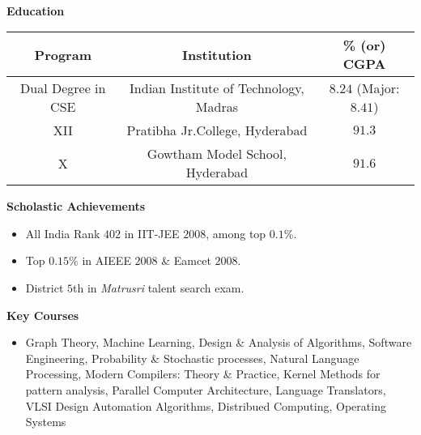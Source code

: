 \documentclass[letterpaper,11pt]{article}
\makeatletter
\newcommand{\resitem}[1]{\item #1 \vspace{-2pt}}
\newcommand{\resheading}[1]{{\large \colorbox{mygrey}{\begin{minipage}{\textwidth}{\textbf{#1 \vphantom{p\^{E}}}}\end{minipage}}}}
\newcommand{\ressubheading}[4]{
\begin{tabular*}{6.5in}{l@{\extracolsep{\fill}}r}
		\textbf{#1} & #2 \\
		\textit{#3} & \textit{#4} \\
\end{tabular*}\vspace{-6pt}}
\makeatother
\begin{document}
\vspace{0.1in}
\hrulefill \\
\vspace{0.05in}
\resheading{Education}
	\begin{center}
	\begin{tabular}{| c | c | c |}
	\hline
	\textbf{Program} & \textbf{Institution} & \textbf{\% (or) CGPA} \\ \hline
	\hspace{0.1in} Dual Degree in CSE \hspace{0.1in} & \hspace{0.1in} Indian Institute of Technology, Madras \hspace{0.1in} & \hspace{0.1in} $8.24$ (Major: $8.41$) \hspace{0.1in} \\ \hline
	XII & Pratibha Jr.College, Hyderabad & $91.3$ \\ \hline
	X & Gowtham Model School, Hyderabad & $91.6$ \\ \hline
	\end{tabular}	
	\end{center}
\resheading{Scholastic Achievements}
	\begin{itemize}
		\resitem{\footnotesize All India Rank $402$ in IIT-JEE $2008$, among top $0.1$\%.}
		\resitem{\footnotesize Top $0.15$\% in AIEEE $2008$ \& Eamcet $2008$.}
		\resitem{\footnotesize District $5$th in \emph{Matrusri} talent search exam.}
	\end{itemize}
\resheading{Key Courses}
					\begin{itemize}
					\resitem{\footnotesize {Graph Theory}, {Machine Learning}, {Design \& Analysis of Algorithms}, {Software Engineering}, {Probability \& Stochastic processes}, {Natural Language Processing}, {Modern Compilers: Theory \& Practice}, {Kernel Methods for pattern analysis}, {Parallel Computer Architecture}, {Language Translators}, {VLSI Design Automation Algorithms}, {Distribued Computing}, {Operating Systems}}
					\end{itemize}
\end{document}

